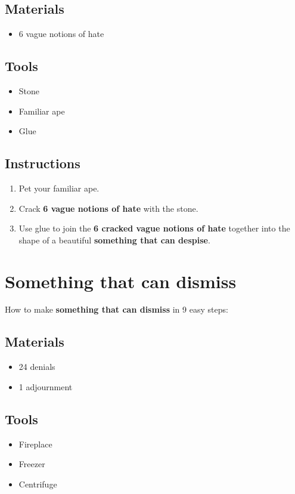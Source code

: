 \documentclass{article}
\begin{document}
\subsection{Materials}\begin{itemize}
\item 
6 vague notions of hate
\end{itemize}
\subsection{Tools}\begin{itemize}
\item 
Stone
\item 
Familiar ape
\item 
Glue
\end{itemize}
\subsection{Instructions}\begin{enumerate}
\item 
Pet your familiar ape.
\item 
Crack \textbf{6 vague notions of hate} with the stone.
\item 
Use glue to join the \textbf{6 cracked vague notions of hate} together into the shape of a beautiful \textbf{something that can despise}.
\end{enumerate}
\newpage
\section{Something that can dismiss}How to make \textbf{something that can dismiss} in 9 easy steps:

\subsection{Materials}\begin{itemize}
\item 
24 denials
\item 
1 adjournment
\end{itemize}
\subsection{Tools}\begin{itemize}
\item 
Fireplace
\item 
Freezer
\item 
Centrifuge
\end{itemize}
\end{document}

